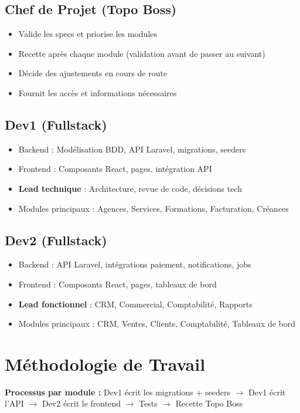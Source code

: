 \documentclass[12pt,a4paper]{report}
\begin{document}
\subsection*{Chef de Projet (Topo Boss)}
\begin{itemize}
    \item Valide les specs et priorise les modules
    \item Recette après chaque module (validation avant de passer au suivant)
    \item Décide des ajustements en cours de route
    \item Fournit les accès et informations nécessaires
\end{itemize}

\subsection*{Dev1 (Fullstack)}
\begin{itemize}
    \item Backend : Modélisation BDD, API Laravel, migrations, seeders
    \item Frontend : Composants React, pages, intégration API
    \item \textbf{Lead technique} : Architecture, revue de code, décisions tech
    \item Modules principaux : Agences, Services, Formations, Facturation, Créances
\end{itemize}

\subsection*{Dev2 (Fullstack)}
\begin{itemize}
    \item Backend : API Laravel, intégrations paiement, notifications, jobs
    \item Frontend : Composants React, pages, tableaux de bord
    \item \textbf{Lead fonctionnel} : CRM, Commercial, Comptabilité, Rapports
    \item Modules principaux : CRM, Ventes, Clients, Comptabilité, Tableaux de bord
\end{itemize}

\section{Méthodologie de Travail}

\begin{mdframed}[backgroundcolor=lightgray!30, linecolor=primary]
    \textbf{Processus par module :}
    Dev1 écrit les migrations + seeders $\rightarrow$ Dev1 écrit l'API $\rightarrow$ Dev2 écrit le frontend $\rightarrow$ Tests $\rightarrow$ Recette Topo Boss
\end{mdframed}
\end{document}
